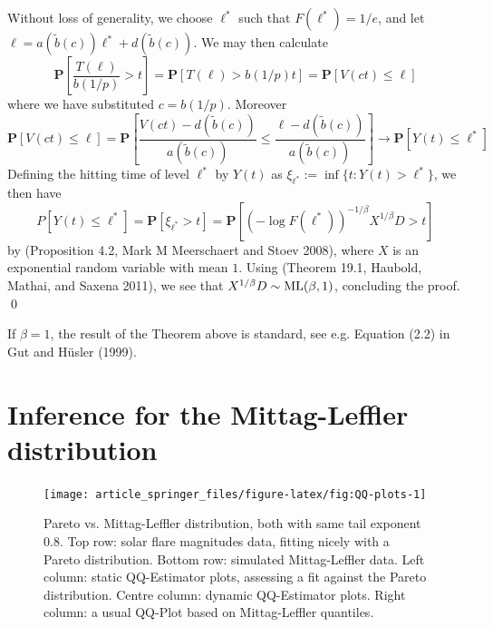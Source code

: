 \documentclass[smallextended]{svjour3}       %
\providecommand{\tightlist}{%
  \setlength{\itemsep}{0pt}\setlength{\parskip}{0pt}}
\begin{document}
Without loss of generality, we choose \(\ell^*\) such that
\(F(\ell^*) = 1/e\), and let
\(\ell = a(\tilde b(c)) \ell^* + d(\tilde b(c))\). We may then calculate
\[
\mathbf P\left[ \frac{T(\ell)}{b(1/p)} > t \right]
= \mathbf P[T(\ell) > b(1/p) t]
= \mathbf P[V(ct) \le \ell]
\] where we have substituted \(c = b(1/p)\). Moreover \[
\mathbf P[V(ct) \le \ell]
= \mathbf P\left[ \frac{V(ct) - d(\tilde b(c))}{a(\tilde b(c))} 
\le \frac{\ell - d(\tilde b(c))}{a(\tilde b(c))} \right]
\longrightarrow \mathbf P\left[ Y(t) \le \ell^* \right]
\] Defining the hitting time of level \(\ell^*\) by \(Y(t)\) as
\(\xi_{\ell^*} := \inf\{t: Y(t) > \ell^*\}\), we then have \[
P\left[ Y(t) \le \ell^* \right] = \mathbf P[\xi_{\ell^*} > t] 
= \mathbf P[(-\log F(\ell^*))^{-1/\beta} X^{1/\beta} D > t]
\] by (Proposition 4.2, Mark M Meerschaert and Stoev 2008), where \(X\)
is an exponential random variable with mean \(1\). Using (Theorem 19.1,
Haubold, Mathai, and Saxena 2011), we see that
\(X^{1/\beta} D \sim {\rm ML}(\beta, 1)\), concluding the proof. \qed

\begin{description}
\tightlist
\item[\textbf{Remark:}]
If \(\beta = 1\), the result of the Theorem above is standard, see e.g.
Equation (2.2) in Gut and Hüsler (1999).
\end{description}

\section{Inference for the Mittag-Leffler
distribution}\label{inference-for-the-mittag-leffler-distribution}

\begin{figure}
\texttt{[image: article\_springer\_files/figure-latex/fig:QQ-plots-1]} \caption{Pareto vs. Mittag-Leffler distribution, both with same tail exponent 0.8. Top row: solar flare magnitudes data, fitting nicely with a Pareto distribution. Bottom row: simulated Mittag-Leffler data. Left column: static QQ-Estimator plots, assessing a fit against the Pareto distribution. Centre column: dynamic QQ-Estimator plots. Right column: a usual QQ-Plot based on Mittag-Leffler quantiles.\label{fig:QQ-plots}}\label{fig:fig:QQ-plots}
\end{figure}
\end{document}
